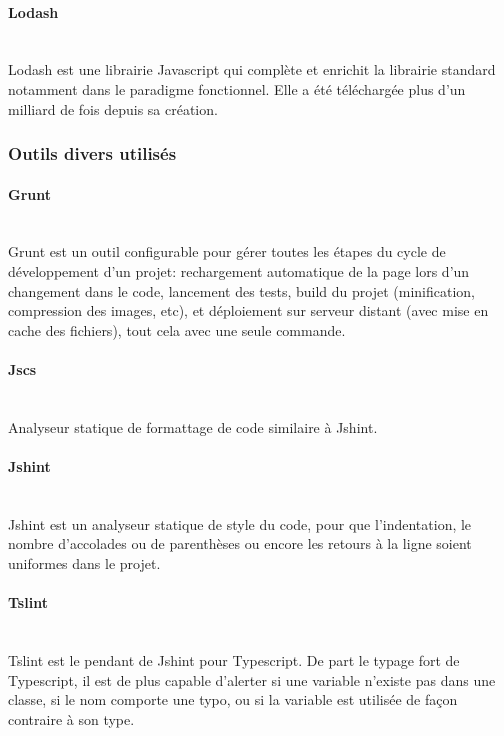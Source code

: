 \documentclass[a4paper,french,12pt]{article}
\begin{document}
		  \paragraph{Lodash}~\\	
		  Lodash est une librairie Javascript qui complète et enrichit la librairie standard notamment dans le paradigme fonctionnel.
		  Elle a été téléchargée plus d'un milliard de fois depuis sa création.
		  

		\subsubsection{Outils divers utilisés}
		  \paragraph{Grunt}~\\	
		  Grunt est un outil configurable pour gérer toutes les étapes du cycle de développement d'un projet: rechargement automatique de la page lors d'un changement dans le code, lancement des tests, build du projet (minification, compression des images, etc), et déploiement sur serveur distant (avec mise en cache des fichiers), tout cela avec une seule commande.

		\paragraph{Jscs}~\\	
		Analyseur statique de formattage de code similaire à Jshint.	  
		  
		 \paragraph{Jshint}~\\	
		 Jshint est un analyseur statique de style du code, pour que l'indentation, le nombre d'accolades ou de parenthèses ou encore les retours à la ligne soient uniformes dans le projet.
		 
		\paragraph{Tslint}~\\	
		Tslint est le pendant de Jshint pour Typescript. De part le typage fort de Typescript, il est de plus capable d'alerter si une variable n'existe pas dans une classe, si le nom comporte une typo, ou si la variable est utilisée de façon contraire à son type.
		
\end{document}
